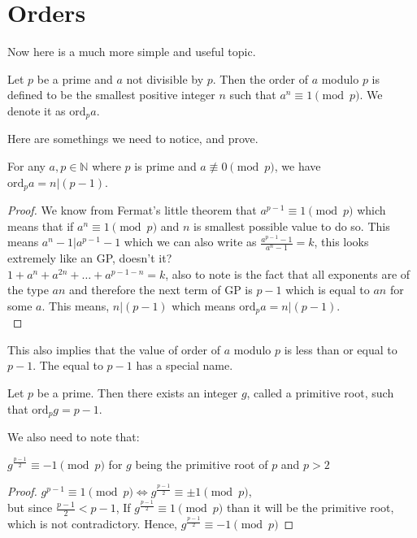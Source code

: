 \section{Orders}
Now here is a much more simple and useful topic. \\
\begin{definition}
Let $p$ be a prime and $a$ not divisible by $p$. Then the order of $a$ modulo $p$ is defined to be the smallest positive integer $n$ such that $a^n \equiv 1 \pmod{p}$. We denote it as $\text{ord}_p{a}$.
\end{definition}
Here are somethings we need to notice, and prove.\\
\begin{theorem}
   For any $a,p \in \mathbb{N}$ where $p$ is prime and $a \not\equiv 0 \pmod{p}$, we have $\text{ord}_p{a}=n|(p-1)$.
\end{theorem}
\begin{proof}
    We know from Fermat's little theorem that $a^{p-1} \equiv 1 \pmod{p}$ which means that if $a^n \equiv 1 \pmod{p}$ and $n$ is smallest possible value to do so.  This means $a^n-1|a^{p-1}-1$ which we can also write as $\frac{a^{p-1}-1}{a^n-1}=k$, this looks extremely like an GP, doesn't it?\\
    $1+a^n+a^{2n}+\dots+a^{p-1-n}=k$, also to note is the fact that all exponents are of the type $an$ and therefore the next term of GP is $p-1$ which is equal to $an$ for some $a$. This means,  $n|(p-1)$ which means $\text{ord}_p{a}=n|(p-1)$.\\
\end{proof}
This also implies that the value of order of $a$ modulo $p$ is less than or equal to $p-1$. The equal to $p-1$ has a special name.\\
\begin{definition}
    Let $p$ be a prime. Then there exists an integer $g$, called a primitive root, such that $\text{ord}_p{g}=p-1$.
\end{definition}
We also need to note that:\\
\begin{theorem}
    $g^{\frac{p-1}{2}} \equiv -1 \pmod{p}$ for $g$ being the primitive root of $p$ and $p>2$
\end{theorem}
\begin{proof}
$g^{p-1}\equiv1\pmod{p} \iff g^{\frac{p-1}{2}} \equiv \pm 1 \pmod{p}$,\\
but since $\frac{p-1}{2}<p-1$, If $g^{\frac{p-1}{2}} \equiv 1 \pmod{p}$ than it will be the primitive root, which is not contradictory. Hence, $g^{\frac{p-1}{2}} \equiv -1 \pmod{p}$
\end{proof}

